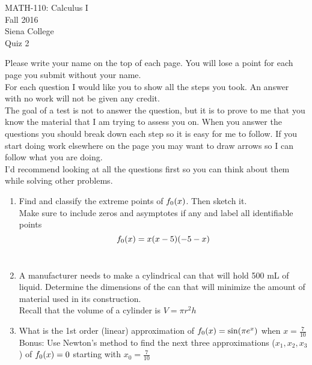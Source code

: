 \documentclass[11pt]{article}
\begin{document}
	\begin{center}
		MATH-110: Calculus I\\
		Fall 2016\\
		Siena College\\
		\vspace{.1in}
		Quiz 2
	\end{center}
	\vspace{.1in}
	
	Please write your name on the top of each page. You will lose a point for each page you submit without your name.\\
	
	For each question I would like you to show all the steps you took. An answer with no work will not be given any credit.\\
	
	The goal of a test is not to answer the question, but it is to prove to me that you know the material that I am trying to assess you on.  When you answer the questions you should break down each step so it is easy for me to follow.  If you start doing work elsewhere on the page you may want to draw arrows so I can follow what you are doing.\\
	
	I'd recommend looking at all the questions first so you can think about them while solving other problems.\\
	
	\newpage
	\begin{enumerate}
		\item  Find and classify the extreme points of $f_{\number\value{enumi}}(x)$. Then sketch it.\\
		Make sure to include zeros and asymptotes if any and label all identifiable points
		$$f_{\number\value{enumi}}(x) = x(x-5)(-5-x)$$\\
		\newpage
		\item  A manufacturer needs to make a cylindrical can that will hold 500 mL of liquid. Determine the dimensions of the can that will minimize the amount of material used in its construction.\\
		Recall that the volume of a cylinder is $V = \pi r^2 h$
		\newpage
		\item  What is the 1st order (linear) approximation of $f_{\number\value{enumi}}(x) = \sin(\pi e^x)$ when $x = \frac{7}{10}$\\
		Bonus: Use Newton's method to find the next three approximations ($x_1, x_2, x_3$) of $f_{\number\value{enumi}}(x) = 0$ starting with $x_0 = \frac{7}{10}$
	\end{enumerate}
	
\end{document}
